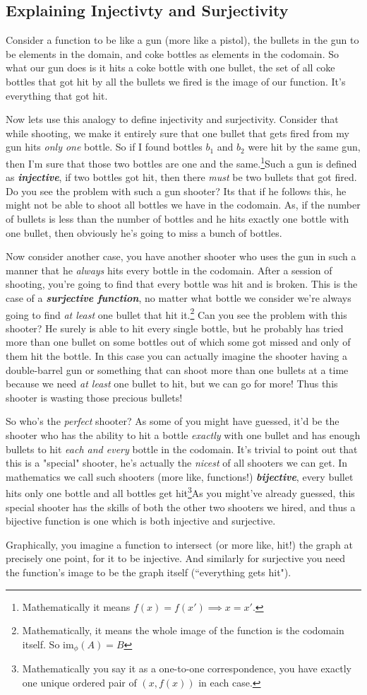 \documentclass[a4paper]{article}
\begin{document}
\subsection{Explaining Injectivty and Surjectivity}
Consider a function to be like a gun (more like a pistol), the bullets in the gun to be elements in the domain, and coke bottles as elements in the codomain. So what our gun does is it hits a coke bottle with one bullet, the set of all coke bottles that got hit by all the bullets we fired is the image of our function. It's everything that got hit. 

Now lets use this analogy to define injectivity and surjectivity. Consider that while shooting, we make it entirely sure that one bullet that gets fired from my gun hits \textit{only one} bottle. So if I found bottles $b_{1}$ and $b_{2}$ were hit by the same gun, then I'm sure that those two bottles are one and the same.\footnote{Mathematically it means $f(x) = f(x') \implies x =x'$.}Such a gun is defined as \textit{\textbf{injective}}, if two bottles got hit, then there \emph{must} be two bullets that got fired. Do you see the problem with such a gun shooter? Its that if he follows this, he might not be able to shoot all bottles we have in the codomain. As, if the number of bullets is less than the number of bottles and he hits exactly one bottle with one bullet, then obviously he's going to miss a bunch of bottles. 


Now consider another case, you have another shooter who uses the gun in such a manner that he \emph{always} hits every bottle in the codomain. After a session of shooting, you're going to find that every bottle was hit and is broken. This is the case of a \textit{\textbf{surjective function}}, no matter what bottle we consider we're always going to find \emph{at least} one bullet that hit it.\footnote{Mathematically, it means the whole image of the function is the codomain itself. So $\mathrm{im}_{\phi}(A) = B$} Can you see the problem with this shooter? He surely is able to hit every single bottle, but he probably has tried more than one bullet on some bottles out of which some got missed and only of them hit the bottle. In this case you can actually imagine the shooter having a double-barrel gun or something that can shoot more than one bullets at a time because we need \emph{at least} one bullet to hit, but we can go for more! Thus this shooter is wasting those precious bullets!

So who's the \textit{perfect} shooter? As some of you might have guessed, it'd be the shooter who has the ability to hit a bottle \emph{exactly} with one bullet and has enough bullets to hit \emph{each and every} bottle in the codomain. It's trivial to point out that this is a "special" shooter, he's actually the \emph{nicest} of all shooters we can get. In mathematics we call such shooters (more like, functions!) \textit{\textbf{bijective}}, every bullet hits only one bottle and all bottles get hit\footnote{Mathematically you say it as a one-to-one correspondence, you have exactly one unique ordered pair of $(x,f(x))$ in each case.}As you might've already guessed, this special shooter has the skills of both the other two shooters we hired, and thus a bijective function is one which is both injective and surjective.

Graphically, you imagine a function to intersect (or more like, hit!) the graph at precisely one point, for it to be injective. And similarly for surjective you need the function's image to be the graph itself (``everything gets hit"). 
\end{document}
